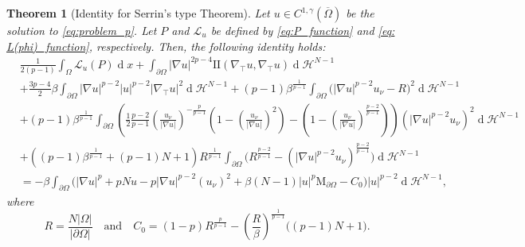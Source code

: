 \documentclass[10pt,a4paper]{amsart}
\numberwithin{equation}{section}
\newtheorem{teo}{Theorem}[section]
\renewcommand{\d}[1]{\ensuremath{\operatorname{d}\!{#1}}}
\begin{document}
\begin{teo}[Identity for Serrin's type Theorem] \label{teo: identity serrin}
Let $u \in C^{1,\gamma}(\overline{\Omega})$ be the solution to \eqref{eq:problem_p}. Let $P$ and $\mathcal{L}_u$ be defined by \eqref{eq:P_function} and \eqref{eq: L(phi)_function}, respectively. Then, the following identity holds:
\begin{equation}\label{eq: fundamental identity for serrin}
    \begin{aligned}
    &\frac{1}{2(p-1)}\int_\Omega \mathcal{L}_u(P) \d{x} +\int_{\partial\Omega} |\nabla u|^{2p-4} \mathrm{I\!I}(\nabla_\top u,\nabla_\top u) \d{}\mathcal{H}^{N-1} 
    \\
    &+ \frac{3p-4}{2} \beta \int_{\partial\Omega} |\nabla u|^{p-2}|u|^{p-2}|\nabla_\top u|^2 \d{}\mathcal{H}^{N-1} 
    + (p-1) \beta^{\frac{1}{p-1}} \int_{\partial\Omega} \Big(|\nabla u|^{p-2} u_\nu - R \Big)^2  \d{}\mathcal{H}^{N-1}  
    \\
    &
    + (p-1) \beta^{\frac{1}{p-1}}  \int_{\partial\Omega}  \left( \frac{1}{2} \frac{p-2}{p-1} \left(\frac{u_\nu}{|\nabla u|}\right)^{-\frac{p}{p-1}} \left(1- \left(\frac{u_\nu}{|\nabla u|}\right)^2 \right) - \left(1- \left(\frac{u_\nu}{|\nabla u|}\right)^{\frac{p-2}{p-1}} \right) \right) (|\nabla u|^{p-2} u_\nu)^2 \d{}\mathcal{H}^{N-1} 
    \\
    &
    + \left( (p-1) \beta^{\frac{1}{p-1}} + (p-1)N + 1 \right) R^{\frac{1}{p-1}}  \int_{\partial\Omega} \Big( R^{\frac{p-2}{p-1}} - (|\nabla u|^{p-2} u_\nu)^{\frac{p-2}{p-1}} \Big)  \d{}\mathcal{H}^{N-1}
    \\
    &
    = - \beta \int_{\partial\Omega} \Big( |\nabla u|^p + pNu - p |\nabla u|^{p-2} (u_\nu)^2 + \beta(N-1) |u|^p \mathrm{M}_{\partial\Omega}  - C_0 \Big) |u|^{p-2} \d{}\mathcal{H}^{N-1},  
    \end{aligned}
\end{equation}
where
\begin{equation*}
    R = \frac{N|\Omega|}{|\partial\Omega|} \quad \text{and} \quad  C_0 = (1-p)R^{\frac{p}{p-1}} - \left( \frac{R}{\beta} \right)^{\frac{1}{p-1}} \big( (p-1)N + 1 \big). 
\end{equation*}
\end{teo}
\end{document}
